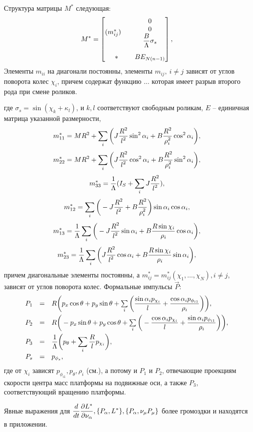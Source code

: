 Структура матрицы $M^*$ следующая:
$$
M^* = \begin{bmatrix}
        (m^*_{ij}) \quad & \begin{matrix} 0 \\ 0 \\ \displaystyle\frac{\displaystyle B}{\displaystyle \Lambda}\sigma_s \end{matrix} \\[25pt]
        *          & BE_{N(n-1)}                                                                  \\
    \end{bmatrix},
$$
Элементы $m_{ii}$ на диагонали постоянны, элементы $m_{ij},\ i\neq j$ зависят от углов поворота колес $\chi_i$, причем содержат функцию $...$ которая имеет разрыв второго рода при смене роликов. 

где $\sigma_s = \sin(\chi_k+\kappa_l)$, и $k, l$ соответствуют свободным роликам, $E$ -- единичная матрица указанной размерности,
$$ m^*_{11} = MR^2 + \sum\limits_i \bigg( J\displaystyle\frac{\displaystyle R^2}{\displaystyle l^2}\sin^2\alpha_i + B\displaystyle\frac{\displaystyle R^2}{\displaystyle \rho_i^2}\cos^2\alpha_i\bigg), $$
$$ m^*_{22} = MR^2 + \sum\limits_i \bigg(J\displaystyle\frac{\displaystyle R^2}{\displaystyle l^2}\cos^2\alpha_i + B\displaystyle\frac{\displaystyle R^2}{\displaystyle \rho_i^2}\sin^2\alpha_i\bigg), $$
$$ m^*_{33} = \displaystyle\frac{\displaystyle 1}{\displaystyle \Lambda}(I_S + \sum\limits_i J\displaystyle\frac{\displaystyle R^2}{\displaystyle l^2}), $$
$$ m^*_{12} = \sum\limits_i \bigg(-J\displaystyle\frac{\displaystyle R^2}{\displaystyle l^2} + B\displaystyle\frac{\displaystyle R^2}{\displaystyle \rho_i^2}\bigg)\sin\alpha_i\cos\alpha_i, $$
$$ m^*_{13} = \displaystyle\frac{\displaystyle 1}{\displaystyle \Lambda}\sum\limits_i \bigg(-J\displaystyle\frac{\displaystyle R^2}{\displaystyle l^2}\sin\alpha_i +  B\displaystyle\frac{\displaystyle R\sin\chi_i}{\displaystyle \rho_i}\cos\alpha_i\bigg), $$
$$ m^*_{23} = \displaystyle\frac{\displaystyle 1}{\displaystyle \Lambda}\sum\limits_i \bigg(J\displaystyle\frac{\displaystyle R^2}{\displaystyle l^2}\cos\alpha_i +  B\displaystyle\frac{\displaystyle R\sin\chi_i}{\displaystyle \rho_i}\sin\alpha_i\bigg),$$
причем диагональные элементы постоянны, а $m^*_{ij} = m^*_{ij}(\chi_1,\ldots,\chi_N), i \neq j$, зависят от углов поворота колес. Формальные импульсы $\vec{P}$:
\begin{equation}\label{P}
    \begin{array}{rcl}
        P_1 & = & R\bigg(p_x\cos\theta + p_y\sin\theta + \sum\limits_{i}\bigg(\ddfrac{\sin\alpha_ip_{\chi_i}}{l} +  \ddfrac{\cos\alpha_ip_{\phi_{i1}}}{\rho_i}\bigg)\bigg),\vsp
        P_2 & = & R\bigg(-p_x\sin\theta + p_y\cos\theta + \sum\limits_{i}\bigg(-\ddfrac{\cos\alpha_ip_{\chi_i}}{l} +  \ddfrac{\sin\alpha_ip_{\phi_{i1}}}{\rho_i}\bigg)\bigg),\vsp
        P_3 & = & \ddfrac{1}{\Lambda}\bigg(p_\theta + \sum\limits_{i}\ddfrac{R}{l}p_{\chi_i}\bigg),\vsp
        P_s & = & p_{\phi_s},
    \end{array}
\end{equation}
где от $\chi_i$ зависят $p_{\phi_{i1}}, p_\theta, \rho_i$ (см.), а потому и $P_1$ и $P_2$, отвечающие проекциям скорости центра масс платформы на подвижные оси, а также $P_3$, соответствующий вращению платформы.

Явные выражения для $\displaystyle\frac{\displaystyle d}{\displaystyle dt}\frac{\partial L^{*}}{\partial \nu_\alpha}, \{P_\alpha, L^{*}\}, \{P_\alpha, \nu_\mu P_\mu\}$ более громоздки и находятся в приложении.